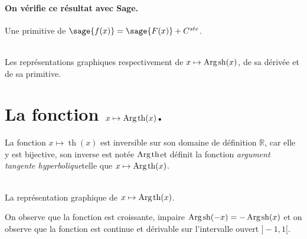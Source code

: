 \documentclass[a4paper,landscape,17pt]{extreport} %
\def\eclaire{\mathbb}
\def\R{\ensuremath{\eclaire R}}
\renewcommand{\sinh}{\mathop{\mathrm{sh}}}
\renewcommand{\tanh}{\mathop{\mathrm{th}}}
\renewcommand{\arg}{\mathop{\mathrm{Arg}}}
\begin{document}
\paragraph{On vérifie ce résultat avec Sage.}


Une primitive de $\sage{f(x)} = \sage{F(x)} + C^{ste} $.

\begin{center}
\\
Les représentations graphiques respectivement de $x \mapsto \arg\mspace{-1mu}\sinh(x)$, de sa dérivée et de sa primitive.
\end{center}

\section{La fonction  $x \mapsto \arg\mspace{-1mu}\tanh(x)$.}

La fonction $x \mapsto \tanh(x)$ est inversible sur son domaine de définition $\R$, car elle y est bijective, son inverse est notée \og$ \arg\mspace{-1mu}\tanh $\fg et définit la fonction \og\emph{argument tangente hyperbolique}\fg telle que $x \mapsto \arg\mspace{-1mu}\tanh(x)$.


\begin{center}
 \\
La représentation graphique de $x \mapsto \arg\mspace{-1mu}\tanh(x)$.
\end{center}
On observe que la fonction est croissante, impaire $\arg\mspace{-1mu}\sinh(-x) = -\arg\mspace{-1mu}\sinh(x) $
et on observe que la fonction est continue et dérivable sur l'intervalle ouvert $]-1,1[$.                                                                                                             
\end{document}
